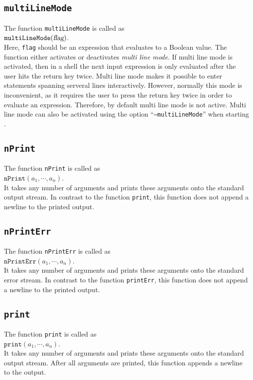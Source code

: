 \subsection{\texttt{multiLineMode}}
The function \texttt{multiLineMode}  is called as
\\[0.2cm]
\hspace*{1.3cm}
$\mathtt{multiLineMode}(\textsl{flag})$.
\\[0.2cm]
Here, \texttt{flag} should be an expression that evaluates to a  Boolean value.  The
function either activates or deactivates \emph{multi line mode}.  If multi line mode is
activated, then in a shell the next input expression is only evaluated after  the user
hits the return key twice.  Multi line mode makes it possible to enter statements spanning
serveral lines interactively.  However, normally this mode is inconvenient, as it requires
the user to press the return key twice in order to evaluate an expression.  Therefore, by
default multi line mode is not active.  Multi line mode can also be activated using the option 
``\texttt{--multiLineMode}'' when starting \setlx.

\subsection{\texttt{nPrint}}
The function \texttt{nPrint}  is called as
\\[0.2cm]
\hspace*{1.3cm}
$\mathtt{nPrint}(a_1, \cdots, a_n)$.
\\[0.2cm]
It takes any number of arguments and prints these arguments onto the standard output
stream.  In contrast to the function
\texttt{print}, this function does not append a newline to the printed output.

\subsection{\texttt{nPrintErr}}
The function \texttt{nPrintErr}  is called as
\\[0.2cm]
\hspace*{1.3cm}
$\mathtt{nPrintErr}(a_1, \cdots, a_n)$.
\\[0.2cm]
It takes any number of arguments and prints these arguments onto the standard error
stream.  In contrast to the function
\texttt{printErr}, this function does not append a newline to the printed output.

\subsection{\texttt{print}}
The function \texttt{print}  is called as
\\[0.2cm]
\hspace*{1.3cm}
$\mathtt{print}(a_1, \cdots, a_n)$.
\\[0.2cm]
It takes any number of arguments and prints these arguments onto the standard output
stream.  After all arguments are
printed, this function appends a newline to the output.

